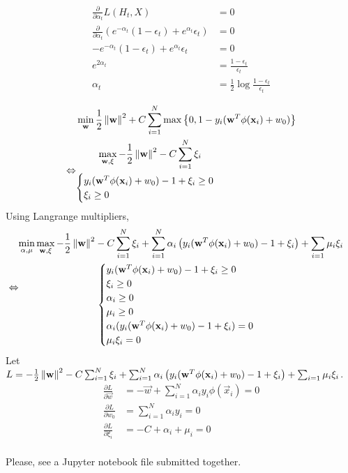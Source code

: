 \documentclass{introtosml}
\newcommand{\x}{\vec{x}}
\newcommand{\w}{\vec{w}}
\newcommand{\e}[1]{\epsilon_{#1}}
\newcommand\ywxxi{y_i (\w^T \phi(\x_i) + w_0) - 1 + \xi_i}
\newcommand\loss{
  - \frac{1}{2} \norm{\w}^2 - C \sum_{i=1}^N \xi_i
  + \sum_{i=1}^N \alpha_i \left( y_i (\w^T \phi(\x_i) + w_0) - 1 + \xi_i \right)
  + \sum_{i=1} \mu_i \xi_i}
\begin{document}
\begin{p}
  \item
    \begin{align*}
      \frac{\partial}{\partial \alpha_t} L(H_t, X) & = 0 \\
      \frac{\partial}{\partial \alpha_t} \left(
        e^{-\alpha_t} (1 - \e{t}) + e^{\alpha_t} \e{t}
      \right) & = 0 \\
      - e^{-\alpha_t} (1 - \e{t}) + e^{\alpha_t} \e{t} & = 0 \\
      e^{2 \alpha_t} & = \frac{1 - \e{t}}{\e{t}} \\
      \alpha_t & = \frac{1}{2} \log \frac{1 - \e{t}}{\e{t}}
    \end{align*}

  \item
    \begin{align*}
      & \min_\w \frac{1}{2} \norm{\w}^2
      + C \sum_{i=1}^N \max \left\{ 0, 1 - y_i (\w^T \phi(\x_i) + w_0) \right\} \\
      \Leftrightarrow & \begin{gathered}
        \max_{\w, \xi} - \frac{1}{2} \norm{\w}^2 - C \sum_{i=1}^N \xi_i \\
        \begin{cases}
          y_i (\w^T \phi(\x_i) + w_0) - 1 + \xi_i \ge 0 \\
          \xi_i \ge 0
        \end{cases}
      \end{gathered}
    \end{align*}
    Using Langrange multipliers,
    \begin{align*}
      \Leftrightarrow & \begin{gathered}
        \min_{\alpha, \mu} \max_{\w, \xi} \loss \\
        \begin{cases}
          \ywxxi \ge 0 \\
          \xi_i \ge 0 \\
          \alpha_i \ge 0 \\
          \mu_i \ge 0 \\
          \alpha_i (\ywxxi) = 0 \\
          \mu_i \xi_i = 0
        \end{cases}
      \end{gathered}
    \end{align*}
    Let $L = \loss$.
    \begin{align*}
      \frac{\partial L}{\partial \w} & = - \w + \sum_{i=1}^N \alpha_i y_i \phi(\x_i) = 0 \\
      \frac{\partial L}{\partial w_0} & = \sum_{i=1}^N \alpha_i y_i = 0 \\
      \frac{\partial L}{\partial \xi_i} & = - C + \alpha_i + \mu_i = 0 \\
    \end{align*}

  \item
    Please, see a Jupyter notebook file submitted together.
\end{p}
\end{document}
